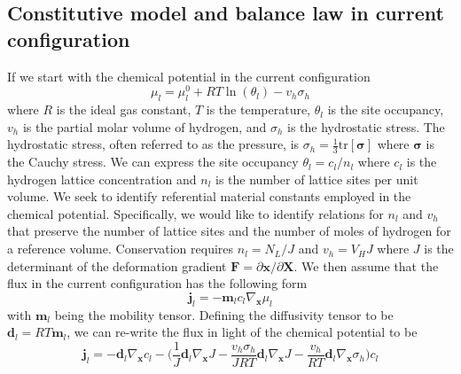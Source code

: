 \documentclass[10pt]{elsarticle}
\newcommand{\mbs}[1]{\boldsymbol{#1}}
\def\bs{{\mbs{s}}} \def\bt{{\mbs{t}}} \def\bu{{\mbs{u}}}
\def\bs{\boldsymbol}
\begin{document}
\subsection{Constitutive model and balance law in current configuration} If we start with the chemical potential in the current configuration
\begin{equation}
\label{eq.chemical.potential}{\mu_{l} = \mu_{l}^{0} + R T \ln(\theta_{l}) - v_{h} \sigma_{h}}
\end{equation}
where $R$ is the ideal gas constant, $T$ is the temperature, $\theta_{l}$ is the site occupancy, $v_{h}$ is the partial molar volume of hydrogen, and $\sigma_{h}$ is the hydrostatic stress. The hydrostatic stress, often referred to as the pressure, is $\sigma_{h} = \frac {1} {3} \text{tr}[\bs{\sigma}]$ where $\bs{\sigma}$ is the Cauchy stress. We can express the site occupancy $\theta_{l} = c_{l}/n_{l}$ where $c_{l}$ is the hydrogen lattice concentration and $n_{l}$ is the number of lattice sites per unit volume. We seek to identify referential material constants employed in the chemical potential. Specifically, we would like to identify relations for $n_{l}$ and $v_{h}$ that preserve the number of lattice sites and the number of moles of hydrogen for a reference volume. Conservation requires $n_{l} = N_{L}/J$ and $v_{h} = V_{H}J$ where $J$ is the determinant of the deformation gradient $\bs{F} = \partial \bs{x} / \partial \bs{X}$. We then assume that the flux in the current configuration has the following form
%
\begin{equation}
\label{eq.flux}{\bs{j}_{l} = -\bs{m}_{l} c_{l} \nabla_{\bs{x}}\mu_{l}}
\end{equation}
%
with $\bs{m}_{l}$ being the mobility tensor. Defining the diffusivity tensor to be $\bs{d}_{l} = R T \bs{m}_{l} $, we can re-write the flux in light of the chemical potential to be 
\begin{equation}
\label{eq.flux2}{\bs{j}_{l} = -\bs{d}_{l}  \nabla_{\bs{x}}c_{l} - \bigg(\frac{1}{J} \bs{d}_{l} \nabla_{\bs{x}}J -  \frac{v_{h}\sigma_{h}}{JRT} \bs{d}_{l} \nabla_{\bs{x}}J} - \frac{v_{h}}{R T} \bs{d}_{l} \nabla_{\bs{x}} \sigma_{h} \bigg)c_{l}
\end{equation}
\end{document}
